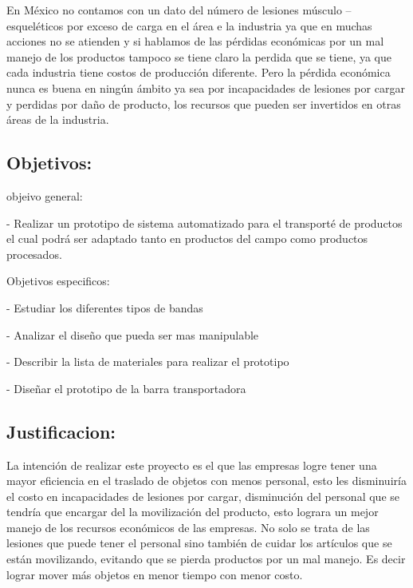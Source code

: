 \documentclass[12pt,a4paper]{article}
\begin{document}
\begin{flushleft}
En México no contamos con un dato  del número de lesiones músculo – esqueléticos  por exceso de carga en el área e la industria ya que en muchas acciones no se atienden  y si hablamos de las pérdidas económicas por un mal manejo de los productos tampoco se tiene claro la perdida que se tiene, ya que cada industria tiene costos de producción diferente.
Pero  la pérdida económica nunca es buena en ningún ámbito ya sea por incapacidades  de lesiones por cargar  y perdidas por daño de producto, los recursos que pueden ser invertidos en otras áreas de la  industria. 

\end{flushleft}
\subsection{Objetivos:}
\begin{flushleft}
objeivo general:
\end{flushleft}
\begin{center}
-	Realizar  un prototipo de sistema automatizado para el transporté de productos el cual podrá ser adaptado  tanto en productos del campo como productos procesados. 
\end{center}
\begin{flushleft}
Objetivos especificos:
\end{flushleft}
\begin{center}
-	Estudiar los diferentes tipos  de  bandas
\end{center}
\begin{center}
-	Analizar el  diseño que pueda ser mas manipulable 
\end{center}
\begin{center}
-	Describir la lista de materiales para  realizar el prototipo
\end{center}
\begin{center}
-	Diseñar el prototipo de la barra transportadora
\end{center}
 \subsection{Justificacion:}
 \begin{flushleft}
 La intención de realizar este proyecto es el que las empresas logre tener una mayor eficiencia en el traslado  de objetos con menos personal, esto les disminuiría el costo en incapacidades de lesiones por cargar, disminución del personal que se tendría que encargar del la movilización del producto, esto lograra un mejor manejo de los recursos económicos de las empresas.  
No solo se trata de las lesiones que puede tener el personal sino también de cuidar los artículos que se están movilizando, evitando que se pierda productos por un mal manejo. 
Es decir lograr mover más objetos en menor tiempo con menor costo. 


 \end{flushleft}
\end{document}
